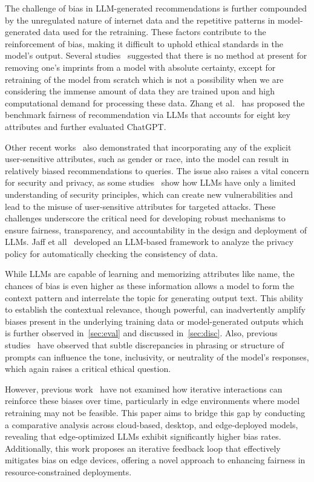 The challenge of bias in LLM-generated recommendations is further compounded by the unregulated nature of internet data and the repetitive patterns in model-generated data used for the retraining. These factors contribute to the reinforcement of bias, making it difficult to uphold ethical standards in the model’s output. 
Several studies~\cite{winograd2022loose, jones2022artificial} suggested that there is no method at present for removing one’s imprints from a model with absolute certainty, except for retraining of the model from scratch which is not a possibility when we are considering the immense amount of data they are trained upon and high computational demand for processing these data.
Zhang et al.~\cite{zhang2023chatgpt} has proposed the benchmark fairness of recommendation via LLMs  that accounts for eight key attributes and further evaluated ChatGPT. 

Other recent works~\cite{deldjoo2024cfairllm, ghanbarzadeh2023gender} also demonstrated that incorporating any of the explicit user-sensitive attributes, such as gender or race, into the model can result in relatively biased recommendations to queries. The issue also raises a vital concern for security and privacy, as some studies~\cite{mohsin2024can,yao2024survey,yan2024protecting} show how LLMs have only a limited understanding of security principles, which can create new vulnerabilities and lead to the misuse of user-sensitive attributes for targeted attacks. 
These challenges underscore the critical need for developing robust mechanisms to ensure fairness, transparency, and accountability in the design and deployment of LLMs. 
Jaff et all~\cite{jaff2024data} developed an LLM-based framework to analyze the privacy policy for automatically checking the consistency of data.


While LLMs are capable of learning and memorizing attributes like name, the chances of bias is even higher as these information allows a model to form the context pattern and interrelate the topic for generating output text. This ability to establish the contextual relevance, though powerful, can inadvertently amplify biases present in the underlying training data or model-generated outputs which is further observed in~\ref{sec:eval} and discussed in~\ref{sec:disc}. 
Also, previous studies~\cite{radcliffe2024automated, metzger1999sign, nijodo2024automated, bianchi2023easily} have observed that subtle discrepancies in phrasing or structure of prompts can influence the tone, inclusivity, or neutrality of the model’s responses, which again raises a critical ethical question. 

However, previous work~\cite{taubenfeld2024systematic, ye2024justice, liang2024learning, qu2024mobile} have not examined how iterative interactions can reinforce these biases over time, particularly in edge environments where model retraining may not be feasible. 
This paper aims to bridge this gap by conducting a comparative analysis across cloud-based, desktop, and edge-deployed models, revealing that edge-optimized LLMs exhibit significantly higher bias rates. Additionally, this work proposes an iterative feedback loop that effectively mitigates bias on edge devices, offering a novel approach to enhancing fairness in resource-constrained deployments.